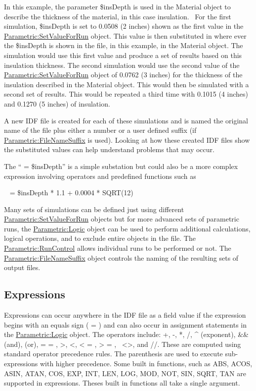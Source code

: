 In this example, the parameter \$insDepth is used in the Material object to describe the thickness of the material, in this case insulation.~ For the first simulation, \$insDepth is set to 0.0508 (2 inches) shown as the first value in the \hyperref[parametricsetvalueforrun]{Parametric:SetValueForRun} object. This value is then substituted in where ever the \$insDepth is shown in the file, in this example, in the Material object. The simulation would use this first value and produce a set of results based on this insulation thickness. The second simulation would use the second value of the \hyperref[parametricsetvalueforrun]{Parametric:SetValueForRun} object of 0.0762 (3 inches) for the thickness of the insulation described in the Material object. This would then be simulated with a second set of results. This would be repeated a third time with 0.1015 (4 inches) and 0.1270 (5 inches) of insulation.

A new IDF file is created for each of these simulations and is named the original name of the file plus either a number or a user defined suffix (if \hyperref[parametricfilenamesuffix]{Parametric:FileNameSuffix} is used). Looking at how these created IDF files show the substituted values can help understand problems that may occur.

The `` = \$insDepth'' is a simple substation but could also be a more complex expression involving operators and predefined functions such as

~ = \$insDepth * 1.1 + 0.0004 * SQRT(12)

Many sets of simulations can be defined just using different \hyperref[parametricsetvalueforrun]{Parametric:SetValueForRun} objects but for more advanced sets of parametric runs, the \hyperref[parametriclogic]{Parametric:Logic} object can be used to perform additional calculations, logical operations, and to exclude entire objects in the file. The \hyperref[parametricruncontrol]{Parametric:RunControl} allows individual runs to be performed or not. The \hyperref[parametricfilenamesuffix]{Parametric:FileNameSuffix} object controls the naming of the resulting sets of output files.

\subsection{Expressions}\label{expressions}

Expressions can occur anywhere in the IDF file as a field value if the expression begins with an equals sign ( = ) and can also occur in assignment statements in the \hyperref[parametriclogic]{Parametric:Logic} object. The operators include: +, -, *, /, \^{} (exponent), \&\& (and), \textbar{}\textbar{} (or), = = , \textgreater{}, \textless{}, \textless{} = , \textgreater{} = ,~ \textless{}\textgreater{}, and //. These are computed using standard operator precedence rules. The parenthesis are used to execute sub-expressions with higher precedence. Some built in functions, such as ABS, ACOS, ASIN, ATAN, COS, EXP, INT, LEN, LOG, MOD, NOT, SIN, SQRT, TAN are supported in expressions. Theses built in functions all take a single argument.

